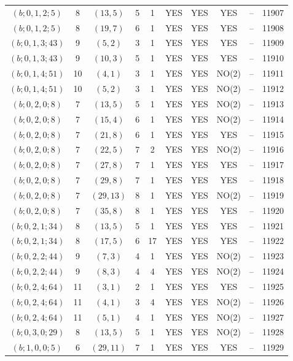 \begin{longtable}{|c|c|c|c|c|c|c|c|c|c|}
$(b; 0, 1, 2; 5)$ & 8 & $(13, 5)$ & 5 & 1 & YES & YES & YES & -- & 11907\\
$(b; 0, 1, 2; 5)$ & 8 & $(19, 7)$ & 6 & 1 & YES & YES & YES & -- & 11908\\
$(b; 0, 1, 3; 43)$ & 9 & $(5, 2)$ & 3 & 1 & YES & YES & YES & -- & 11909\\
$(b; 0, 1, 3; 43)$ & 9 & $(10, 3)$ & 5 & 1 & YES & YES & YES & -- & 11910\\
$(b; 0, 1, 4; 51)$ & 10 & $(4, 1)$ & 3 & 1 & YES & YES & NO(2) & -- & 11911\\
$(b; 0, 1, 4; 51)$ & 10 & $(5, 2)$ & 3 & 1 & YES & YES & NO(2) & -- & 11912\\
$(b; 0, 2, 0; 8)$ & 7 & $(13, 5)$ & 5 & 1 & YES & YES & NO(2) & -- & 11913\\
$(b; 0, 2, 0; 8)$ & 7 & $(15, 4)$ & 6 & 1 & YES & YES & NO(2) & -- & 11914\\
$(b; 0, 2, 0; 8)$ & 7 & $(21, 8)$ & 6 & 1 & YES & YES & YES & -- & 11915\\
$(b; 0, 2, 0; 8)$ & 7 & $(22, 5)$ & 7 & 2 & YES & YES & NO(2) & -- & 11916\\
$(b; 0, 2, 0; 8)$ & 7 & $(27, 8)$ & 7 & 1 & YES & YES & YES & -- & 11917\\
$(b; 0, 2, 0; 8)$ & 7 & $(29, 8)$ & 7 & 1 & YES & YES & YES & -- & 11918\\
$(b; 0, 2, 0; 8)$ & 7 & $(29, 13)$ & 8 & 1 & YES & YES & NO(2) & -- & 11919\\
$(b; 0, 2, 0; 8)$ & 7 & $(35, 8)$ & 8 & 1 & YES & YES & YES & -- & 11920\\
$(b; 0, 2, 1; 34)$ & 8 & $(13, 5)$ & 5 & 1 & YES & YES & YES & -- & 11921\\
$(b; 0, 2, 1; 34)$ & 8 & $(17, 5)$ & 6 & 17 & YES & YES & YES & -- & 11922\\
$(b; 0, 2, 2; 44)$ & 9 & $(7, 3)$ & 4 & 1 & YES & YES & NO(2) & -- & 11923\\
$(b; 0, 2, 2; 44)$ & 9 & $(8, 3)$ & 4 & 4 & YES & YES & NO(2) & -- & 11924\\
$(b; 0, 2, 4; 64)$ & 11 & $(3, 1)$ & 2 & 1 & YES & YES & YES & -- & 11925\\
$(b; 0, 2, 4; 64)$ & 11 & $(4, 1)$ & 3 & 4 & YES & YES & NO(2) & -- & 11926\\
$(b; 0, 2, 4; 64)$ & 11 & $(5, 1)$ & 4 & 1 & YES & YES & NO(2) & -- & 11927\\
$(b; 0, 3, 0; 29)$ & 8 & $(13, 5)$ & 5 & 1 & YES & YES & NO(2) & -- & 11928\\
$(b; 1, 0, 0; 5)$ & 6 & $(29, 11)$ & 7 & 1 & YES & YES & YES & -- & 11929\\

\end{longtable}
